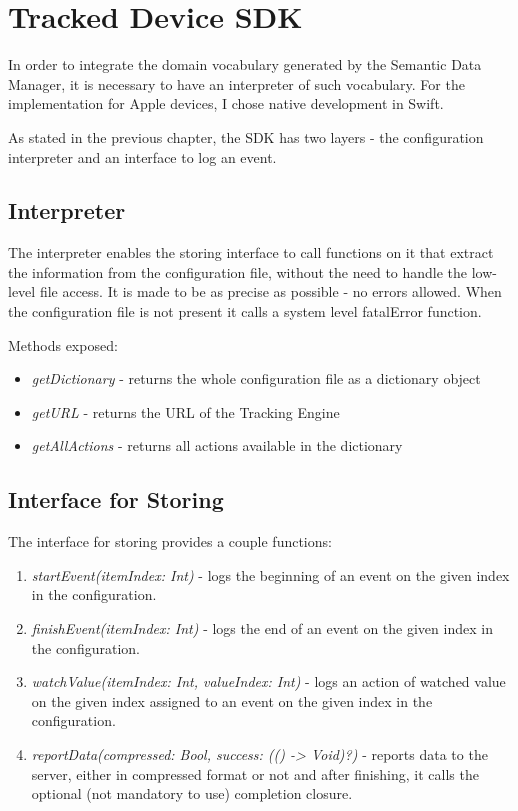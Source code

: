 \newpage

\section{Tracked Device SDK}

In order to integrate the domain vocabulary generated by the Semantic Data Manager, it is necessary to have an interpreter of such vocabulary. For the implementation for Apple devices, I chose native development in Swift.

As stated in the previous chapter, the SDK has two layers - the configuration interpreter and an interface to log an event.

\subsection{Interpreter}

The interpreter enables the storing interface to call functions on it that extract the information from the configuration file, without the need to handle the low-level file access. It is made to be as precise as possible - no errors allowed. When the configuration file is not present it calls a system level fatalError function. 

Methods exposed:

\begin{itemize}
	\item \emph{getDictionary} - returns the whole configuration file as a dictionary object
	\item \emph{getURL} - returns the URL of the Tracking Engine
	\item \emph{getAllActions} - returns all actions available in the dictionary
\end{itemize}

\subsection{Interface for Storing}

The interface for storing provides a couple functions:

\begin{enumerate}
	\item \emph{startEvent(itemIndex: Int)} - logs the beginning of an event on the given index in the configuration.
	\item \emph{finishEvent(itemIndex: Int)} - logs the end of an event on the given index in the configuration.
	\item \emph{watchValue(itemIndex: Int, valueIndex: Int)} - logs an action of watched value on the given index assigned to an event on the given index in the configuration.
	\item \emph{reportData(compressed: Bool, success: (() -> Void)?)} - reports data to the server, either in compressed format or not and after finishing, it calls the optional (not mandatory to use) completion closure.
\end{enumerate}

